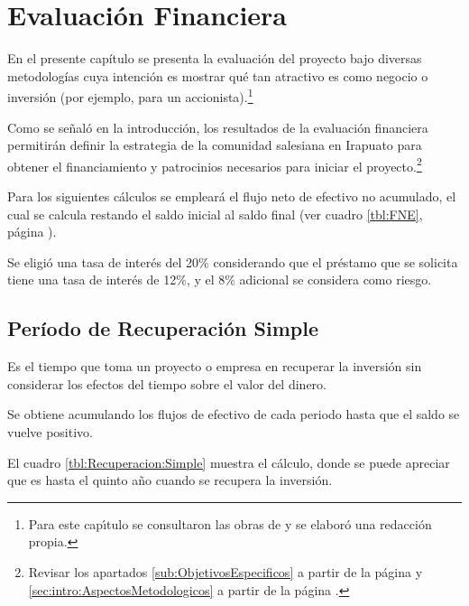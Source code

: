 \chapter{Evaluación Financiera}
\label{cap:Evaluacion:Financiera}

En el presente capítulo se presenta la evaluación del proyecto bajo diversas metodologías cuya intención es mostrar qué tan atractivo es como negocio o inversión (por ejemplo, para un accionista).\footnote{Para este cap\'{\i}tulo se consultaron las obras de \citep{Conant2004, COSS2000, SAPAG2007, Leland2006} y se elabor\'{o} una redacción propia.}


Como se señaló en la introducción, los resultados de la evaluación financiera permitirán definir la estrategia de la comunidad salesiana en Irapuato para obtener el financiamiento y patrocinios necesarios para iniciar el proyecto.\footnote{Revisar los apartados \ref{sub:ObjetivosEspecificos} a partir de la página \pageref{sub:ObjetivosEspecificos} y \ref{sec:intro:AspectosMetodologicos} a partir de la página \pageref{sec:intro:AspectosMetodologicos}.}

Para los siguientes cálculos se empleará el flujo neto de efectivo no acumulado, el cual se calcula restando el saldo inicial al saldo final (ver cuadro \ref{tbl:FNE}, página \pageref{tbl:FNE}).

Se eligió una tasa de interés del 20\% considerando que el préstamo que se solicita tiene una tasa de interés de 12\%, y el 8\% adicional se considera como riesgo.

\section{Período de Recuperación Simple}

Es el tiempo que toma un proyecto o empresa en recuperar la inversión sin considerar los efectos del tiempo sobre el valor del dinero.

Se obtiene acumulando los flujos de efectivo de cada periodo hasta que el saldo se vuelve positivo.

El cuadro \ref{tbl:Recuperacion:Simple} muestra el cálculo, donde se puede apreciar que es hasta el quinto año cuando se recupera la inversión.

